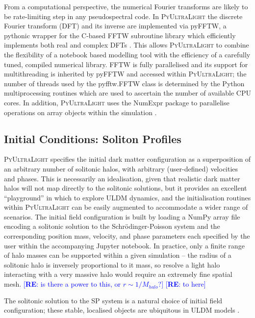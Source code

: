\documentclass[a4paper,11pt]{article}
\newcommand{\PyUltraLight}{\textsc{PyUltraLight}\xspace}
\newcommand{\re}[1]{\textcolor{blue}{[{\bf RE}: #1]}}
\begin{document}
From a computational perspective, the numerical Fourier transforms are likely to be rate-limiting step in any pseudospectral code. In \PyUltraLight the discrete Fourier transform (DFT) and its inverse are implemented via pyFFTW, a pythonic wrapper for the C-based FFTW subroutine library which efficiently implements both real and complex DFTs \cite{pyfftw,fftw,Frigo2005}. This  allows  \PyUltraLight  to combine the flexibility of a notebook based modelling tool with the efficiency of a carefully tuned, compiled numerical library.  FFTW is fully parallelised and its support for multithreading  is inherited  by pyFFTW and accessed within \PyUltraLight; the number of threads used by the pyfftw.FFTW class is determined by the  Python multiprocessing routines which are used to ascertain the number of available CPU cores. In addition, \PyUltraLight uses the NumExpr package to parallelise operations on array objects within the simulation \cite{numexpr}. 

\subsection{Initial Conditions: Soliton Profiles}\label{sec:soliton-profiles}

\PyUltraLight specifies the initial dark matter configuration as a superposition of an arbitrary number of solitonic halos, with arbitrary (user-defined) velocities and phases. This is necessarily an idealisation, given that realistic dark matter halos will not map directly to the solitonic solutions, but it provides an excellent ``playground'' in which to explore ULDM dynamics, and the initialisation routines within \PyUltraLight can be easily augmented to accommodate a wider range of scenarios. The initial field configuration is built by loading a NumPy array file encoding a solitonic solution to the Schr{\"o}dinger-Poisson system and the corresponding position mass, velocity, and phase parameters each specified by the user within the accompanying Jupyter notebook. In practice, only a finite  range of halo masses can be supported within a given simulation -- the  radius of a solitonic halo is inversely proportional to it mass, so resolve a light halo interacting with a very massive halo would require an extremely fine spatial mesh. \re{is there a power to this, or $r \sim 1/M_{halo}$?} \re{to here}

The solitonic solution to the SP system is a natural choice of initial field configuration; these stable, localised objects are ubiquitous in ULDM models \cite{Marsh2015}. 
\end{document}
